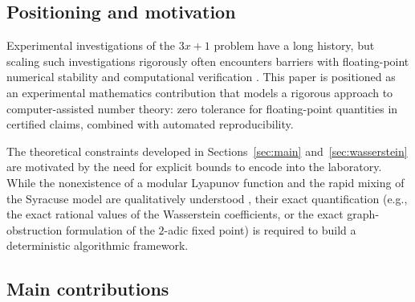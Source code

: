 \documentclass[11pt]{amsart}
\theoremstyle{definition}
\theoremstyle{remark}
\begin{document}
\subsection{Positioning and motivation}\label{sec:positioning}
Experimental investigations of the $3x+1$ problem have a long history, but scaling such investigations rigorously often encounters barriers with floating-point numerical stability and computational verification \cite{simonsdeweger2005,barina2021}. This paper is positioned as an experimental mathematics contribution that models a rigorous approach to computer-assisted number theory: zero tolerance for floating-point quantities in certified claims, combined with automated reproducibility.

The theoretical constraints developed in Sections~\ref{sec:main} and~\ref{sec:wasserstein} are motivated by the need for explicit bounds to encode into the laboratory. While the nonexistence of a modular Lyapunov function and the rapid mixing of the Syracuse model are qualitatively understood \cite{matthewswatts1984,tao2022}, their exact quantification (e.g., the exact rational values of the Wasserstein coefficients, or the exact graph-obstruction formulation of the $2$-adic fixed point) is required to build a deterministic algorithmic framework.

\subsection{Main contributions}\label{sec:contributions}
\end{document}

